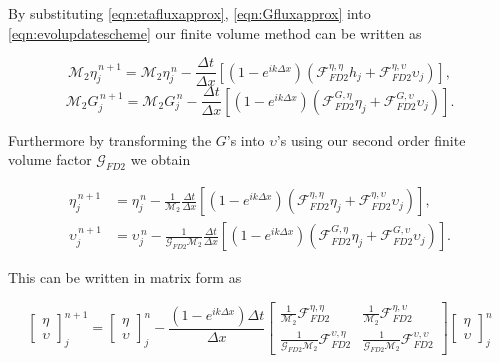 By substituting \eqref{eqn:etafluxapprox}, \eqref{eqn:Gfluxapprox} into \eqref{eqn:evolupdatescheme} our finite volume method can be written as

\begin{equation*}
\mathcal{M}_2 \eta^{\,n + 1}_{j} = \mathcal{M}_2 \eta^{\,n }_{j} - \frac{\Delta t}{\Delta x}  \left[ \left(1 - e^{ik\Delta x}\right) \left(\mathcal{F}_{FD2}^{\eta,\eta} h_{j}  + \mathcal{F}_{FD2}^{\eta,\upsilon} \upsilon_j \right) \right],
\end{equation*}
\begin{equation*}
\mathcal{M}_2 G^{\,n + 1}_{j} = \mathcal{M}_2 G^{\,n }_{j} - \frac{\Delta t}{\Delta x}  \left[ \left(1 - e^{ik\Delta x}\right) \left(  \mathcal{F}_{FD2}^{G,\eta} \eta_{j}  + \mathcal{F}_{FD2}^{G,\upsilon} \upsilon_j \right) \right].
\end{equation*}
	
Furthermore by transforming the $G$'s into $\upsilon$'s using our second order finite volume factor $\mathcal{G}_{FD2}$ we obtain
	
\begin{align*}
\eta^{\,n + 1}_{j} &= \eta^{\,n }_{j} - \frac{1}{\mathcal{M}_2}\frac{\Delta t}{\Delta x}  \left[ \left(1 - e^{ik\Delta x}\right) \left(\mathcal{F}_{FD2}^{\eta,\eta} \eta_{j}  + \mathcal{F}_{FD2}^{\eta,\upsilon} \upsilon_j \right) \right], \\
\upsilon^{\,n + 1}_{j} &= \upsilon^{\,n }_{j} -  \frac{1}{\mathcal{G}_{FD2} \mathcal{M}_2}\frac{\Delta t}{\Delta x}  \left[ \left(1 - e^{ik\Delta x}\right) \left(  \mathcal{F}_{FD2}^{G,\eta} \eta_{j}  + \mathcal{F}_{FD2}^{G,\upsilon} \upsilon_j \right) \right].
\end{align*}

This can be written in matrix form as

\begin{equation*}
\begin{bmatrix}
\eta \\ \upsilon
\end{bmatrix}^{n+1}_j = \begin{bmatrix}
\eta \\ \upsilon
\end{bmatrix}^{n}_j - \frac{\left(1 - e^{ik\Delta x}\right) \Delta t}{\Delta x}\begin{bmatrix}
\frac{1}{\mathcal{M}_2} \mathcal{F}_{FD2}^{\eta,\eta} & \frac{1}{\mathcal{M}_2}\mathcal{F}_{FD2}^{\eta,\upsilon} \\ \frac{1}{\mathcal{G}_{FD2} \mathcal{M}_2}\mathcal{F}_{FD2}^{\upsilon,\eta} & \frac{1}{\mathcal{G}_{FD2} \mathcal{M}_2}\mathcal{F}_{FD2}^{\upsilon,\upsilon} 
\end{bmatrix}\begin{bmatrix}
\eta \\ \upsilon
\end{bmatrix}^{n}_j
\end{equation*}

